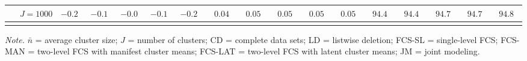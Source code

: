 \begin{sidewaystable}
\begin{threeparttable}
\begin{tabular}{llccccccccccccccc}
 & \nopagebreak $\;J=1000$  & ${-}0.2\phantom{0}$ & ${-}0.1\phantom{0}$ & ${-}0.0\phantom{0}$ & ${-}0.1\phantom{0}$ & ${-}0.2\phantom{0}$ & $\phantom{0}0.04\phantom{0}$ & $\phantom{0}0.05\phantom{0}$ & $\phantom{0}0.05\phantom{0}$ & $\phantom{0}0.05\phantom{0}$ & $\phantom{0}0.05\phantom{0}$ & $\phantom{0}94.4\phantom{0}$ & $\phantom{0}94.4\phantom{0}$ & $\phantom{0}94.7\phantom{0}$ & $\phantom{0}94.7\phantom{0}$ & $\phantom{0}94.8\phantom{0}$ \\
[0.5ex]\hline\\[-1.6ex] 
\end{tabular}
\begin{tablenotes}{\footnotesize \textit{Note.} $\bar{n}$ = average cluster size; $J$ = number of clusters; CD = complete data sets; LD = listwise deletion; FCS-SL = single-level FCS; FCS-MAN = two-level FCS with manifest cluster means; FCS-LAT = two-level FCS with latent cluster means; JM = joint modeling.}\end{tablenotes}
\end{threeparttable}
\end{sidewaystable}
